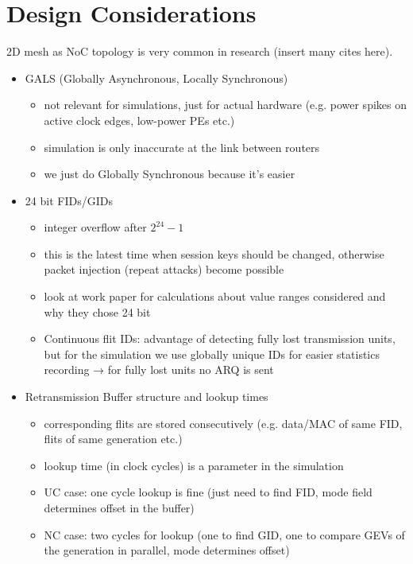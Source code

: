 \section{Design Considerations}
2D mesh as NoC topology is very common in research (insert many cites here).
\begin{itemize}
    \item GALS (Globally Asynchronous, Locally Synchronous)
        \begin{itemize}
            \item not relevant for simulations, just for actual hardware (e.g. power spikes on active clock edges, low-power PEs etc.)
            \item simulation is only inaccurate at the link between routers
            \item we just do Globally Synchronous because it's easier
        \end{itemize}
    \item 24 bit FIDs/GIDs
        \begin{itemize}
            \item integer overflow after $2^{24}-1$
            \item this is the latest time when session keys should be changed, otherwise packet injection (repeat attacks) become
                possible
            \item look at work paper for calculations about value ranges considered and why they chose 24 bit
            \item Continuous flit IDs: advantage of detecting fully lost transmission units, but for the simulation we use globally unique IDs for
                easier statistics recording → for fully lost units no ARQ is sent
        \end{itemize}
    \item Retransmission Buffer structure and lookup times
        \begin{itemize}
            \item corresponding flits are stored consecutively (e.g. data/MAC of same FID, flits of same generation etc.)
            \item lookup time (in clock cycles) is a parameter in the simulation
            \item UC case: one cycle lookup is fine (just need to find FID, mode field determines offset in the buffer)
            \item NC case: two cycles for lookup (one to find GID, one to compare GEVs of the generation in parallel, mode determines offset)

\end{itemize}
\end{itemize}
